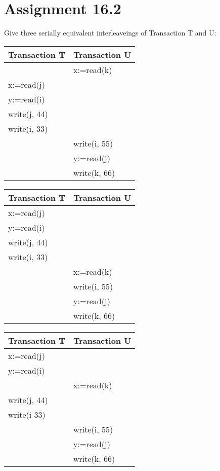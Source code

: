 \section{Assignment 16.2}
Give three serially equivalent interleaveings of Transaction T and U: 

\begin{center}
	\begin{tabular}{| l | l |}
		\hline
		Transaction T & Transaction U \\ \hline
		 & x:=read(k)  \\ \hline
		x:=read(j) &   \\ \hline
		y:=read(i) &  \\ \hline
		write(j, 44) &   \\ \hline
		write(i, 33) &  \\ \hline
		 & write(i, 55) \\ \hline
		 & y:=read(j) \\ \hline
		 & write(k, 66)  \\
		\hline
	\end{tabular}
\end{center}


\begin{center}
	\begin{tabular}{| l | l |}
		\hline
		Transaction T & Transaction U \\ \hline
		x:=read(j) &   \\ \hline
		y:=read(i) &   \\ \hline
		write(j, 44) &  \\ \hline
		write(i, 33) &   \\ \hline
		 & x:=read(k) \\ \hline
		 & write(i, 55) \\ \hline
		 & y:=read(j) \\ \hline
		 & write(k, 66)  \\
		\hline
	\end{tabular}
\end{center}

\begin{center}
	\begin{tabular}{| l | l |}
		\hline
		Transaction T & Transaction U \\ \hline
		x:=read(j) &   \\ \hline
		y:=read(i) &   \\ \hline
		 & x:=read(k) \\ \hline
		write(j, 44) &   \\ \hline
		write(i 33)  &  \\ \hline
		 & write(i, 55) \\ \hline
		 & y:=read(j) \\ \hline
		 & write(k, 66)  \\
		\hline
	\end{tabular}
\end{center}
